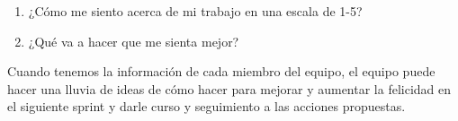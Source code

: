 \begin{enumerate}
{  \begin{enumerate}
  \item {¿Cómo me siento acerca de mi trabajo en una escala de 1-5?}
  \item {¿Qué va a hacer que me sienta mejor?}
  \end{enumerate}

Cuando tenemos la información de cada miembro del equipo, el equipo puede hacer una lluvia de ideas de cómo hacer para mejorar y aumentar la felicidad en el siguiente sprint y darle curso y seguimiento a las acciones propuestas.
}


\end{enumerate}
